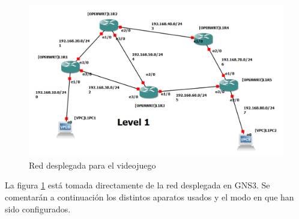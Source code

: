 \begin{figure}[h]
  \centering
  \includegraphics[scale=0.225]{imagenes/redGNS3}
  \caption{Red desplegada para el videojuego}
  \label{fig:esquematico_red}
\end{figure}

La figura \ref{fig:esquematico_red} está tomada directamente de la red desplegada en GNS3. Se comentarán a continuación los distintos aparatos usados y el modo en que han sido configurados.

